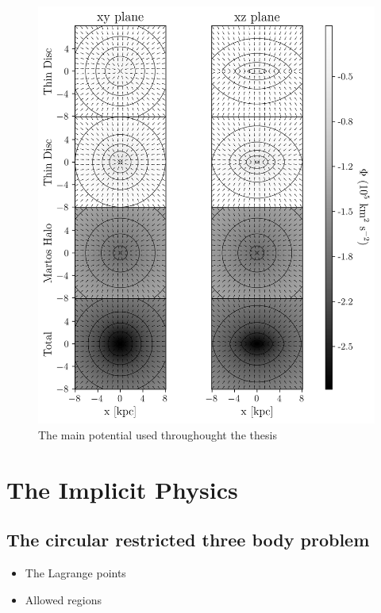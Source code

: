         \begin{figure}
            \centering
            \includegraphics[width=\linewidth]{images/figure_pouliasis2017pii_potential_-8_8.png}
            \caption{The main potential used throughought the thesis}
        \end{figure}        
    

\section{The Implicit Physics}

    \subsection{The circular restricted three body problem}
        \begin{itemize}
            \item The Lagrange points
            \item Allowed regions 
        \end{itemize}

